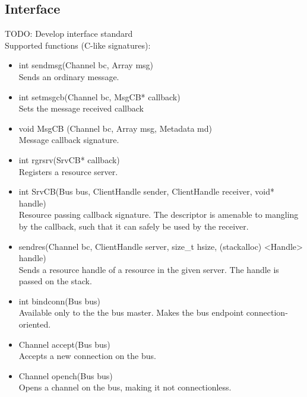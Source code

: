 \subsection{Interface}
TODO: Develop interface standard\\
Supported functions (C-like signatures):
\begin{itemize}
	\item int sendmsg(Channel bc, Array msg)\\
	Sends an ordinary message.
	\item int setmsgcb(Channel bc, MsgCB* callback)\\
	Sets the message received callback
	\item void MsgCB (Channel bc, Array msg, Metadata md)\\
	Message callback signature.
	\item int rgrsrv(SrvCB* callback)\\
	Registers a resource server.
	\item int SrvCB(Bus bus, ClientHandle sender, ClientHandle receiver, void* handle)\\
	Resource passing callback signature. The descriptor is amenable to mangling by the callback, such that it can safely be used by the receiver.
	\item sendres(Channel bc, ClientHandle server, size\_t hsize, (stackalloc) <Handle> handle)\\
	Sends a resource handle of a resource in the given server. The handle is passed on the stack.
	\item int bindconn(Bus bus)\\
	Available only to the the bus master. Makes the bus endpoint connection-oriented.
	\item Channel accept(Bus bus)\\
	Accepts a new connection on the bus.
	\item Channel opench(Bus bus)\\
	Opens a channel on the bus, making it not connectionless.
\end{itemize}